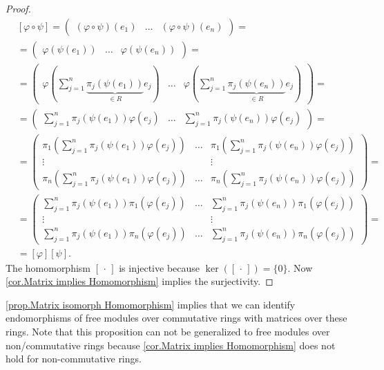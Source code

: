 \begin{proof}
\begin{align*}
&[\varphi\circ\psi]=\begin{pmatrix}(\varphi\circ\psi)(e_1) & \ldots & (\varphi\circ\psi)(e_n)\end{pmatrix}=\\
&=\begin{pmatrix}\varphi(\psi(e_1)) & \ldots & \varphi(\psi(e_n))\end{pmatrix}=\\
&=\left(\begin{smallmatrix}\varphi(\sum_{j=1}^n\underbrace{\pi_j(\psi(e_1))}_{\in R}e_j) & \ldots & \varphi(\sum_{j=1}^n\underbrace{\pi_j(\psi(e_n))}_{\in R}e_j)\end{smallmatrix}\right)=\\
&=\begin{pmatrix}\sum_{j=1}^n\pi_j(\psi(e_1))\varphi(e_j) & \ldots & \sum_{j=1}^n\pi_j(\psi(e_n))\varphi(e_j)\end{pmatrix}=\\
&=\left(\begin{smallmatrix}
\pi_1(\sum_{j=1}^n\pi_j(\psi(e_1))\varphi(e_j)) & \ldots & \pi_1(\sum_{j=1}^n\pi_j(\psi(e_n))\varphi(e_j))\\
\vdots & &\vdots\\
\pi_n(\sum_{j=1}^n\pi_j(\psi(e_1))\varphi(e_j)) & \ldots & \pi_n(\sum_{j=1}^n\pi_j(\psi(e_n))\varphi(e_j))
\end{smallmatrix}\right)=\\
&=\left(\begin{smallmatrix}
\sum_{j=1}^n\pi_j(\psi(e_1))\pi_1(\varphi(e_j)) & \ldots & \sum_{j=1}^n\pi_j(\psi(e_n))\pi_1(\varphi(e_j))\\
\vdots & &\vdots\\
\sum_{j=1}^n\pi_j(\psi(e_1))\pi_n(\varphi(e_j)) & \ldots & \sum_{j=1}^n\pi_j(\psi(e_n))\pi_n(\varphi(e_j))
\end{smallmatrix}\right)=\\
&=[\varphi][\psi].
\end{align*}
The homomorphism $[\,\cdot\,]$ is injective because $\ker([\,\cdot\,])=\lbrace 0\rbrace$. Now \cref{cor.Matrix implies Homomorphism} implies the surjectivity.
\end{proof}

\cref{prop.Matrix isomorph Homomorphism} implies that we can identify endomorphisms of free modules over commutative rings with matrices over these rings. Note that this proposition can not be generalized to free modules over non\-/commutative rings because  \cref{cor.Matrix implies Homomorphism} does not hold for non-commutative rings.
